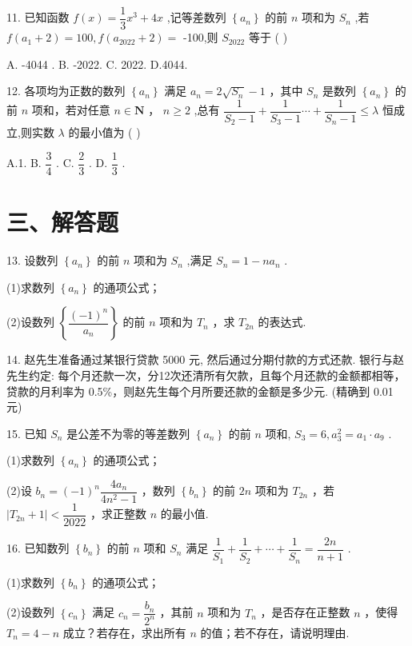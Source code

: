 11. 已知函数 $f\left( x\right)  = \dfrac{1}{3}{x}^{3} + {4x}$ ,记等差数列 $\left\{  {a}_{n}\right\}$ 的前 $n$ 项和为 ${S}_{n}$ ,若 $f\left( {{a}_{1} + 2}\right)  = {100},f\left( {{a}_{2022} + 2}\right)  =$ -100,则 ${S}_{2022}$ 等于 ( )

A. -4044 . B. -2022. C. 2022. D.4044.

12. 各项均为正数的数列 $\left\{  {a}_{n}\right\}$ 满足 ${a}_{n} = 2\sqrt{{S}_{n}} - 1$ ，其中 ${S}_{n}$ 是数列 $\left\{  {a}_{n}\right\}$ 的前 $n$ 项和，若对任意 $n \in  \mathbf{N}$ ， $n \geq  2$ ,总有 $\dfrac{1}{{S}_{2} - 1} + \dfrac{1}{{S}_{3} - 1}\cdots  + \dfrac{1}{{S}_{n} - 1} \leq  \lambda$ 恒成立,则实数 $\lambda$ 的最小值为 ( )

A.1. B. $\dfrac{3}{4}$ . C. $\dfrac{2}{3}$ . D. $\dfrac{1}{3}$ .

\section*{三、解答题}

13. 设数列 $\left\{  {a}_{n}\right\}$ 的前 $n$ 项和为 ${S}_{n}$ ,满足 ${S}_{n} = 1 - n{a}_{n}$ .

(1)求数列 $\left\{  {a}_{n}\right\}$ 的通项公式；

(2)设数列 $\left\{  \dfrac{{\left( -1\right) }^{n}}{{a}_{n}}\right\}$ 的前 $n$ 项和为 ${T}_{n}$ ，求 ${T}_{2n}$ 的表达式.

14. 赵先生准备通过某银行贷款 5000 元, 然后通过分期付款的方式还款. 银行与赵先生约定: 每个月还款一次，分12次还清所有欠款，且每个月还款的金额都相等，贷款的月利率为 0.5\%，则赵先生每个月所要还款的金额是多少元. (精确到 0.01 元)

15. 已知 ${S}_{n}$ 是公差不为零的等差数列 $\left\{  {a}_{n}\right\}$ 的前 $n$ 项和, ${S}_{3} = 6,{a}_{3}^{2} = {a}_{1} \cdot  {a}_{9}$ .

(1)求数列 $\left\{  {a}_{n}\right\}$ 的通项公式；

(2)设 ${b}_{n} = {\left( -1\right) }^{n}\dfrac{4{a}_{n}}{4{n}^{2} - 1}$ ，数列 $\left\{  {b}_{n}\right\}$ 的前 ${2n}$ 项和为 ${T}_{2n}$ ，若 $\left| {{T}_{2n} + 1}\right|  < \dfrac{1}{2022}$ ，求正整数 $n$ 的最小值.

16. 已知数列 $\left\{  {b}_{n}\right\}$ 的前 $n$ 项和 ${S}_{n}$ 满足 $\dfrac{1}{{S}_{1}} + \dfrac{1}{{S}_{2}} + \cdots  + \dfrac{1}{{S}_{n}} = \dfrac{2n}{n + 1}$ .

(1)求数列 $\left\{  {b}_{n}\right\}$ 的通项公式；

(2)设数列 $\left\{  {c}_{n}\right\}$ 满足 ${c}_{n} = \dfrac{{b}_{n}}{{2}^{n}}$ ，其前 $n$ 项和为 ${T}_{n}$ ，是否存在正整数 $n$ ，使得 ${T}_{n} = 4 - n$ 成立？若存在，求出所有 $n$ 的值；若不存在，请说明理由.

